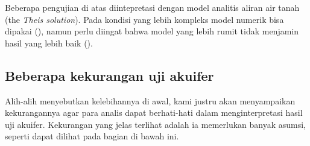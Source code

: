 Beberapa pengujian di atas diintepretasi dengan model analitis  aliran air tanah (the \textit{Theis solution}). Pada kondisi yang lebih kompleks model numerik bisa dipakai (\cite{lebbe1995validation}), namun perlu diingat bahwa model yang lebih rumit tidak menjamin hasil yang lebih baik (\cite{Johnson_2001}\cite{Rushton_1976}\cite{Rathod_1984}\cite{2011}\cite{Lebbe_1999}\cite{Lebbe_1999}). 

\subsection{Beberapa kekurangan uji akuifer}

Alih-alih menyebutkan kelebihannya di awal, kami justru akan menyampaikan kekurangannya agar para analis dapat berhati-hati dalam menginterpretasi hasil uji akuifer. Kekurangan yang jelas terlihat adalah ia memerlukan banyak asumsi, seperti dapat dilihat pada bagian di bawah ini.

